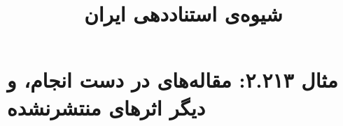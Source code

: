 \documentclass[a4paper,10pt]{article}
\begin{document}
\title{شیوه‌ی استناددهی ایران
 }
\author{}
\date{}
\maketitle



\section*{مثال ۲.۲۱۳: مقاله‌های در دست انجام، و دیگر اثرهای منتشرنشده}

\cite{علیدوستی1385}\\
\cite{شیری2000}\\
\cite{feber1971}\\
\cite{alarco1971}\\






\end{document}
